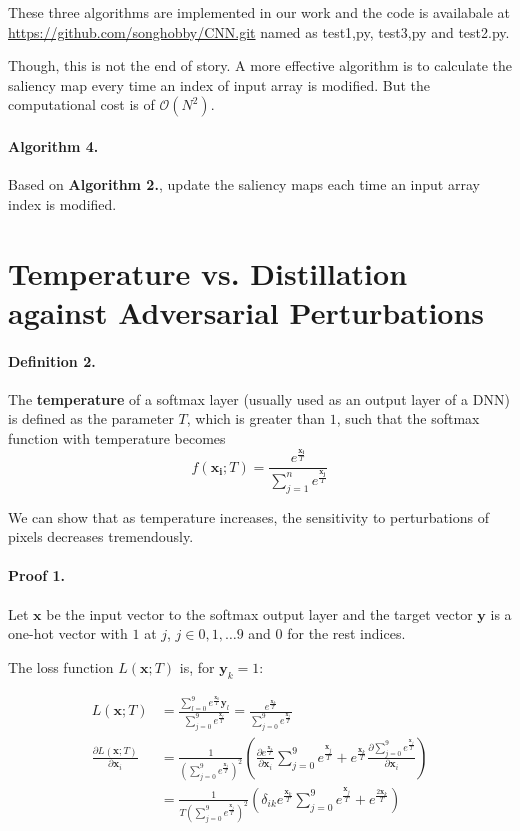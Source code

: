 \documentclass{article}
\begin{document}
These three algorithms are implemented in our work and the code is availabale at \url{https://github.com/songhobby/CNN.git} named as test1,py, test3,py and test2.py.

Though, this is not the end of story. A more effective algorithm is to calculate the saliency map every time an index of input array is modified. But the computational cost is of $\mathcal{O}(N^2)$.
\paragraph{Algorithm 4.}
Based on \textbf{Algorithm 2.}, update the saliency maps each time an input array index is modified.
\section{Temperature vs. Distillation against Adversarial Perturbations}

\paragraph{Definition 2.}
The \textbf{temperature} of a softmax layer (usually used as an output layer of a DNN) is defined as the parameter $T$, which is greater than $1$, such that the softmax function with temperature becomes 
\begin{equation}
	f(\mathbf{x_i};T)=\frac{e^{\frac{\mathbf{x_i}}{T}}}{\sum_{j=1}^n 
	e^{\frac{\mathbf{x_j}}{T}}}
\end{equation}

We can show that as temperature increases, the sensitivity to perturbations of pixels decreases tremendously.

\paragraph{Proof 1.}
Let $\mathbf{x}$ be the input vector to the softmax output layer and the target vector $\mathbf{y}$ is a one-hot vector with $1$ at $j$, $j\in{0,1,\dots 9}$ and $0$ for the rest indices.

The loss function $L(\mathbf{x};T)$ is, for $\mathbf{y}_k=1$:

\begin{align}
	L(\mathbf{x};T) &= \frac{\sum_{l=0}^9e^{\frac{\mathbf{x}_k}{T}}\mathbf{y}_l}{\sum_{j=0}^9 e^{\frac{\mathbf{x}_j}{T}}} = \frac{e^{\frac{\mathbf{x}_k}{T}}}{\sum_{j=0}^9 e^{\frac{\mathbf{x}_j}{T}}} \\
	\frac{\partial L(\mathbf{x};T)}{\partial \mathbf{x}_i} &= 
	\frac{1}{(\sum_{j=0}^9 e^{\frac{\mathbf{x}_j}{T}})^2}
	(
	\frac{\partial e^{\frac{\mathbf{x}_k}{T}}}{\partial \mathbf{x}_i}
	\sum_{j=0}^9 e^{\frac{\mathbf{x}_j}{T}} 
	+ e^{\frac{\mathbf{x}_k}{T}}
	\frac{\partial \sum_{j=0}^9 e^{\frac{\mathbf{x}_j}{T}}}{\partial \mathbf{x}_i}
	) \nonumber \\
	&=
	\frac{1}{T(\sum_{j=0}^9 e^{\frac{\mathbf{x}_j}{T}})^2} (
	\delta_{ik} e^{\frac{\mathbf{x}_k}{T}}
	\sum_{j=0}^9 e^{\frac{\mathbf{x}_j}{T}}+
	e^{\frac{2\mathbf{x}_k}{T}} ) \nonumber 
\end{align}
\end{document}
